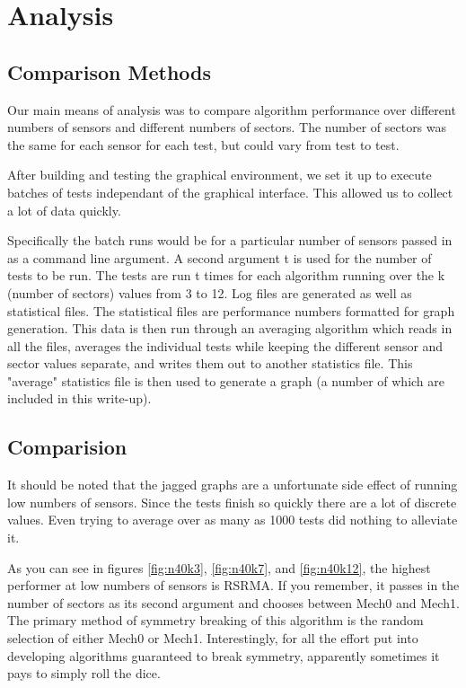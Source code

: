 \section{Analysis}

\subsection{Comparison Methods}

Our main means of analysis was to compare algorithm performance over different numbers of sensors and different numbers of sectors. The number of sectors was the same for each sensor for each test, but could vary from test to test.

After building and testing the graphical environment, we set it up to execute batches of tests independant of the graphical interface. This allowed us to collect a lot of data quickly.

Specifically the batch runs would be for a particular number of sensors passed in as a command line argument. A second argument t is used for the number of tests to be run. The tests are run t times for each algorithm running over the k (number of sectors) values from 3 to 12. Log files are generated as well as statistical files. The statistical files are performance numbers formatted for graph generation. 
This data is then run through an averaging algorithm which reads in all the files, averages the individual tests while keeping the different sensor and sector values separate, and writes them out to another statistics file. This "average" statistics file is then used to generate a graph (a number of which are included in this write-up).

\subsection{Comparision}

It should be noted that the jagged graphs are a unfortunate side effect of running low numbers of sensors. Since the tests finish so quickly there are a lot of discrete values. Even trying to average over as many as 1000 tests did nothing to alleviate it.

As you can see in figures \ref{fig:n40k3}, \ref{fig:n40k7}, and \ref{fig:n40k12}, the highest performer at low numbers of sensors is RSRMA. If you remember, it passes in the number of sectors as its second argument and chooses between Mech0 and Mech1. The primary method of symmetry breaking of this algorithm is the random selection of either Mech0 or Mech1. Interestingly, for all the effort put into developing algorithms guaranteed to break symmetry, apparently sometimes it pays to simply roll the dice. 

